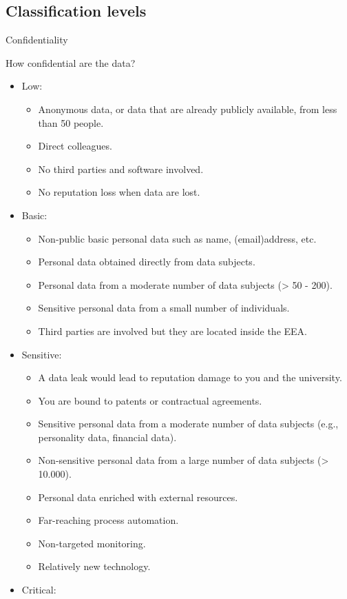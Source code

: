 \documentclass[
]{book}
\providecommand{\tightlist}{%
  \setlength{\itemsep}{0pt}\setlength{\parskip}{0pt}}
\begin{document}
\hypertarget{classification-levels}{%
\subsection{Classification levels}\label{classification-levels}}

Confidentiality

How confidential are the data?

\begin{itemize}
\tightlist
\item
  Low:

  \begin{itemize}
  \tightlist
  \item
    Anonymous data, or data that are already publicly available, from less than
    50 people.
  \item
    Direct colleagues.
  \item
    No third parties and software involved.
  \item
    No reputation loss when data are lost.
  \end{itemize}
\item
  Basic:

  \begin{itemize}
  \tightlist
  \item
    Non-public basic personal data such as name, (email)address, etc.
  \item
    Personal data obtained directly from data subjects.
  \item
    Personal data from a moderate number of data subjects (\textgreater{} 50 - 200).
  \item
    Sensitive personal data from a small number of individuals.
  \item
    Third parties are involved but they are located inside the EEA.
  \end{itemize}
\item
  Sensitive:

  \begin{itemize}
  \tightlist
  \item
    A data leak would lead to reputation damage to you and the university.
  \item
    You are bound to patents or contractual agreements.
  \item
    Sensitive personal data from a moderate number of data subjects (e.g.,
    personality data, financial data).
  \item
    Non-sensitive personal data from a large number of data subjects (\textgreater{} 10.000).
  \item
    Personal data enriched with external resources.
  \item
    Far-reaching process automation.
  \item
    Non-targeted monitoring.
  \item
    Relatively new technology.
  \end{itemize}
\item
  Critical:


\end{itemize}
\end{document}

